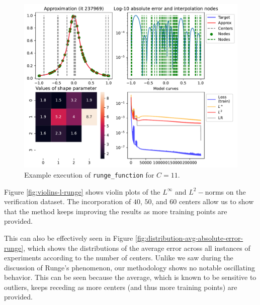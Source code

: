 \documentclass[12pt]{report} %
\begin{document}
\begin{figure}
  \includegraphics[width=\textwidth]{imagenes/experiments/1d/statistical_1d_full_scheduler_interpolation/runge_function/runge_function-TR44-C11-Kgaussian_kernel-Sh1.5625-7-E237969.pdf}
  \caption{Example execution of \texttt{runge\_function} for $C=11$.}
  \label{fig:example-execution-runge}
\end{figure}

Figure \ref{fig:violins-l-runge} shows violin plots of the $L^\infty$ and $L^2-$norms on the verification dataset. The incorporation of $40$, $50$, and $60$ centers allow us to show that the method keeps improving the results as more training points are provided.

This can also be effectively seen in Figure \ref{fig:distribution-avg-absolute-error-runge}, which shows the distributions of the average error across all instances of experiments according to the number of centers. Unlike we saw during the discussion of Runge's phenomenon, our methodology shows no notable oscillating behavior. This can be seen because the average, which is known to be sensitive to outliers, keeps receding as more centers (and thus more training points) are provided.
\end{document}
